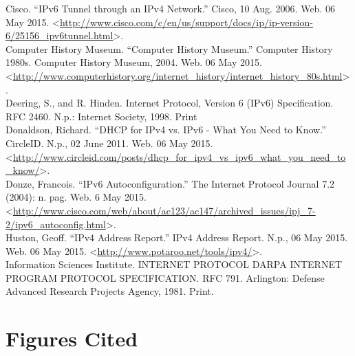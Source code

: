 \documentclass[12pt]{article}
\begin{document}
\begin{hangparas}{0.25in}{1}
Cisco. ``IPv6 Tunnel through an IPv4 Network.'' Cisco, 10 Aug. 2006. Web. 06 May 2015. <\url{http://www.cisco.com/c/en/us/support/docs/ip/ip-version-6/25156_ipv6tunnel.html}>.\\

Computer History Museum. ``Computer History Museum.'' Computer History 1980s. Computer History Museum, 2004. Web. 06 May 2015. <\url{http://www.computerhistory.org/internet_history/internet_history_80s.html}>.\\

Deering, S., and R. Hinden. Internet Protocol, Version 6 (IPv6) Specification. RFC 2460. N.p.: Internet Society, 1998. Print\\

Donaldson, Richard. ``DHCP for IPv4 vs. IPv6 - What You Need to Know.'' CircleID. N.p., 02 June 2011. Web. 06 May 2015. <\url{http://www.circleid.com/posts/dhcp_for_ipv4_vs_ipv6_what_you_need_to_know/}>.\\

Donze, Francois. ``IPv6 Autoconfiguration.'' The Internet Protocol Journal 7.2 (2004): n. pag. Web. 6 May 2015. <\url{http://www.cisco.com/web/about/ac123/ac147/archived_issues/ipj_7-2/ipv6_autoconfig.html}>.\\

Huston, Geoff. ``IPv4 Address Report.'' IPv4 Address Report. N.p., 06 May 2015. Web. 06 May 2015. <\url{http://www.potaroo.net/tools/ipv4/}>.\\

Information Sciences Institute. INTERNET PROTOCOL DARPA INTERNET PROGRAM PROTOCOL SPECIFICATION. RFC 791. Arlington: Defense Advanced Research Projects Agency, 1981. Print.
\end{hangparas}

\begingroup
\let\clearpage\relax

\bigskip
\section{Figures Cited}
\end{document}
